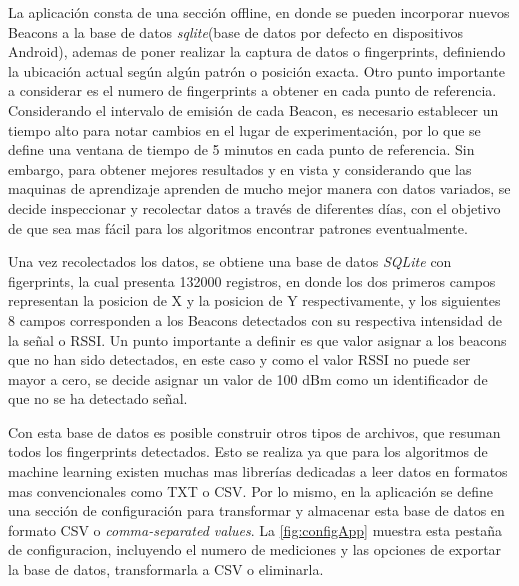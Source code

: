 La aplicación consta de una sección offline, en donde se pueden incorporar nuevos Beacons a la base de datos \textit{sqlite}(base de datos por defecto en dispositivos Android), ademas de poner realizar  la captura de datos o fingerprints, definiendo la ubicación actual según algún patrón o posición exacta. Otro punto importante a considerar es el numero de fingerprints a obtener en cada punto de referencia. Considerando el intervalo de emisión de cada Beacon, es necesario establecer un tiempo alto para notar cambios en el lugar de experimentación, por lo que se define una ventana de tiempo de 5 minutos en cada punto de referencia. Sin embargo, para obtener mejores resultados y en vista y considerando que las maquinas de aprendizaje aprenden de mucho mejor manera con datos variados, se decide inspeccionar y recolectar datos a través de diferentes días, con el objetivo de que sea mas fácil para los algoritmos encontrar patrones eventualmente.

Una vez recolectados los datos, se obtiene una base de datos \textit{SQLite} con figerprints, la cual presenta 132000 registros, en donde los dos primeros campos representan la posicion de X y la posicion de Y respectivamente, y los siguientes 8 campos corresponden a los Beacons detectados con su respectiva intensidad de la señal o RSSI. Un punto importante a definir es que valor asignar a los beacons que no han sido detectados, en este caso y como el valor RSSI no puede ser mayor a cero, se decide asignar un valor de 100 dBm como un identificador de que no se ha detectado señal.

Con esta base de datos es posible construir otros tipos de archivos, que resuman todos los fingerprints detectados. Esto se realiza ya que para los algoritmos de machine learning existen muchas mas librerías dedicadas a leer datos en formatos mas convencionales como TXT o CSV. Por lo mismo, en la aplicación se define una sección de configuración para transformar y almacenar esta base de datos en formato CSV o \textit{comma-separated values}.  La \autoref{fig:configApp} muestra esta pestaña de configuracion, incluyendo el numero de mediciones y las opciones de exportar la base de datos, transformarla a CSV o eliminarla.

